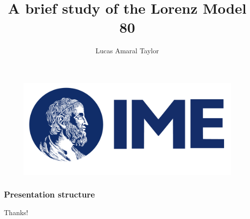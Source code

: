 \documentclass[
    11pt,               %
]{beamer}
\title[Lorenz 80]{A brief study of the Lorenz Model 80}
\author[TAYLOR, Lucas A.]{Lucas Amaral Taylor}
\institute[IME-USP]{Institute of Mathematics and Statistics}
\begin{document}
\begin{frame}
    \begin{figure}
        \includegraphics[width=0.4\linewidth]{img/logo_IME.png}
    \end{figure}
    \titlepage
\end{frame}

\begin{frame}
    \frametitle{Presentation structure}
    \tableofcontents
\end{frame}








\begin{frame}
    \begin{center}
        {\Huge Thanks!}
    \end{center}
\end{frame}
\end{document}
